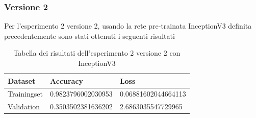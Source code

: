 \subsubsection{Versione 2}
Per l'esperimento 2 versione 2, usando la rete pre-trainata InceptionV3 definita precedentemente sono stati ottenuti i seguenti risultati
\begin{table}[H]
    \begin{tabular}{|l|l|l|}
    \hline
    \textbf{Dataset}     & \textbf{Accuracy}           & \textbf{Loss}                 \\ \hline
    Trainingset & 0.9823796002030953 & 0.06881602044664113 \\ \hline
    Validation  & 0.3503502381636202 & 2.6863035547729965  \\ \hline
    \end{tabular}
   	\caption{\label{tab:esperimento2_v2_risultati}Tabella dei risultati dell'esperimento 2 versione 2 con InceptionV3}
\end{table}

